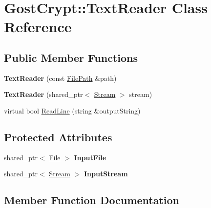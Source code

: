 \hypertarget{class_gost_crypt_1_1_text_reader}{}\section{Gost\+Crypt\+:\+:Text\+Reader Class Reference}
\label{class_gost_crypt_1_1_text_reader}
\subsection*{Public Member Functions}
\begin{DoxyCompactItemize}
\item 
\mbox{\label{class_gost_crypt_1_1_text_reader_a4c8ffc8b411ca1ee056c7c3c0d618262}} 
{\bfseries Text\+Reader} (const \hyperlink{class_gost_crypt_1_1_filesystem_path}{File\+Path} \&path)
\item 
\mbox{\label{class_gost_crypt_1_1_text_reader_a04dadda94b06dba1dd5dfaaf66214d68}} 
{\bfseries Text\+Reader} (shared\+\_\+ptr$<$ \hyperlink{class_gost_crypt_1_1_stream}{Stream} $>$ stream)
\item 
virtual bool \hyperlink{class_gost_crypt_1_1_text_reader_a4bd89d732dbce6cd8eb57a4088542769}{Read\+Line} (string \&output\+String)
\end{DoxyCompactItemize}
\subsection*{Protected Attributes}
\begin{DoxyCompactItemize}
\item 
\mbox{\label{class_gost_crypt_1_1_text_reader_a46cf7e0bfdb6e42ad8afaf6813a5243f}} 
shared\+\_\+ptr$<$ \hyperlink{class_gost_crypt_1_1_file}{File} $>$ {\bfseries Input\+File}
\item 
\mbox{\label{class_gost_crypt_1_1_text_reader_aeb8f6638b11a7512bd0bcc6bcd0c122e}} 
shared\+\_\+ptr$<$ \hyperlink{class_gost_crypt_1_1_stream}{Stream} $>$ {\bfseries Input\+Stream}
\end{DoxyCompactItemize}


\subsection{Member Function Documentation}
\mbox{\label{class_gost_crypt_1_1_text_reader_a4bd89d732dbce6cd8eb57a4088542769}} 
